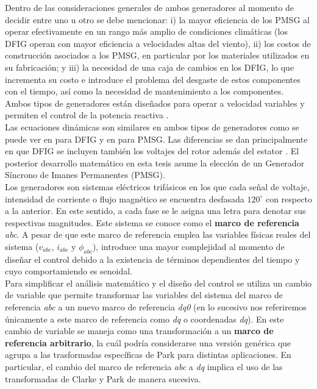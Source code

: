 Dentro de las consideraciones generales de ambos generadores al momento de decidir entre uno u otro 
se debe mencionar: i) la mayor eficiencia de los PMSG al operar efectivamente 
en un rango más amplio de condiciones climáticas (los DFIG operan con mayor eficiencia a velocidades 
altas del viento), ii) los costos de construcción asociados a los PMSG, 
en particular por los materiales utilizados en su fabricación; y iii) la necesidad de una caja de 
cambios en los DFIG, lo que incrementa su costo e introduce el problema del 
desgaste de estos componentes con el tiempo, así como la necesidad de mantenimiento a los componentes. 
Ambos tipos de generadores están diseñados  para operar a velocidad variables y permiten el control de 
la potencia reactiva \cite{dahiya2019, swibki2020,Lei2006,feijoo2000}. 
\\

Las ecuaciones dinámicas son similares en ambos 
tipos de generadores como se puede ver en \cite{Lei2006} para DFIG y en \cite{cisneros2020} para PMSG. 
Las diferencias se dan principalmente en que DFIG se incluyen también los voltajes del rotor además del estator \cite{Lei2006}.
El posterior desarrollo matemático en esta tesis asume la elección de un Generador Síncrono de Imanes 
Permanentes (PMSG).
\\

Los generadores son sistemas eléctricos trifásicos en los que cada señal de voltaje, intensidad de corriente 
o flujo magnético se encuentra desfasada $120^\circ$ con respecto a la anterior. En este sentido, a cada fase se le 
asigna una letra para denotar sus respectivas magnitudes. Este sistema se conoce como el \textbf{marco de referencia}
\emph{abc}. A pesar de que este marco de referencia emplea las variables físicas reales del sistema ($v_{abc}$, $i_{abc}$ y $\phi_{abc}$), 
introduce una mayor complejidad al momento de diseñar el control debido a la existencia de términos dependientes del 
tiempo y cuyo comportamiendo es senoidal. 
\\

Para simplificar el análisis matemático y el diseño del control se utiliza un cambio de variable que permite transformar 
las variables del sistema del marco de referencia \emph{abc} a un nuevo marco de referencia \emph{dq0} (en lo sucesivo nos referiremos 
únicamente a este marco de referencia como \emph{dq} o coordenadas \emph{dq}). En \cite{krause2013} este cambio de variable se maneja como
una transformación a un \textbf{marco de referencia arbitrario}, la cuál podría considerarse una versión genérica que agrupa a las trasformadas
específicas de Park \cite{park1929} para distintas aplicaciones. En particular, el cambio del marco de referencia \emph{abc} a \emph{dq} implica el uso de 
las transformadas de Clarke \cite{clarke1943} y Park de manera sucesiva. 
\\

